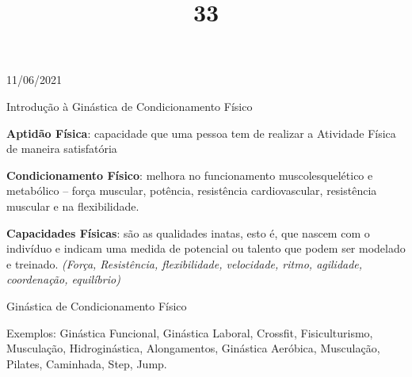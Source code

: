 \documentclass{SchoolBook}
\begin{document}
    \begin{day}{11/06/2021}
        \title{3}{Introdução à Ginástica de Condicionamento Físico}
        
        \textbf{Aptidão Física}: capacidade que uma pessoa tem de realizar a Atividade Física de maneira satisfatória
        
        \textbf{Condicionamento Físico}: melhora no funcionamento muscolesquelético e metabólico -- força muscular, potência, resistência cardiovascular, resistência muscular e na flexibilidade.
        
        \textbf{Capacidades Físicas}: são as qualidades inatas, esto é, que nascem com o indivíduo e indicam uma medida de potencial ou talento que podem ser modelado e treinado. \emph{(Força, Resistência, flexibilidade, velocidade, ritmo, agilidade, coordenação, equilíbrio)}
        
        \title{3}{Ginástica de Condicionamento Físico}
        
        Exemplos: Ginástica Funcional, Ginástica Laboral, Crossfit, Fisiculturismo, Musculação, Hidroginástica, Alongamentos, Ginástica Aeróbica, Musculação, Pilates, Caminhada, Step, Jump.
    \end{day}
    
\end{document}
